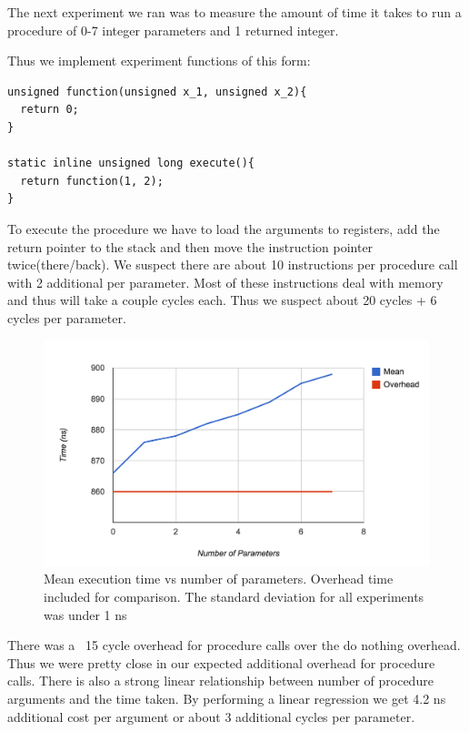 The next experiment we ran was to measure the amount of time it takes to run a procedure of 0-7 integer parameters and 1 returned integer.

Thus we implement experiment functions of this form: 
\begin{verbatim}
unsigned function(unsigned x_1, unsigned x_2){
  return 0;
}

static inline unsigned long execute(){
  return function(1, 2);
}
\end{verbatim}

To execute the procedure we have to load the arguments to registers, add the return pointer to the stack and then move the instruction pointer twice(there/back).
We suspect there are about 10 instructions per procedure call with 2 additional per parameter.  Most of these instructions deal with memory and thus will take a couple cycles each.  Thus we suspect about 20 cycles + 6 cycles per parameter.


\begin{figure}[h]
\centering
\includegraphics[scale=.5]{experiments/exp_1_2_fig.png}
\caption{Mean execution time vs number of parameters.  Overhead time included for comparison.  The standard deviation for all experiments was under 1 ns}
\end{figure}

There was a ~15 cycle overhead for procedure calls over the do nothing overhead.  Thus we were pretty close in our expected additional overhead for procedure calls.  There is also a strong linear relationship between number of procedure arguments and the time taken.  By performing a linear regression we get 4.2 ns additional cost per argument or about 3  additional cycles per parameter.